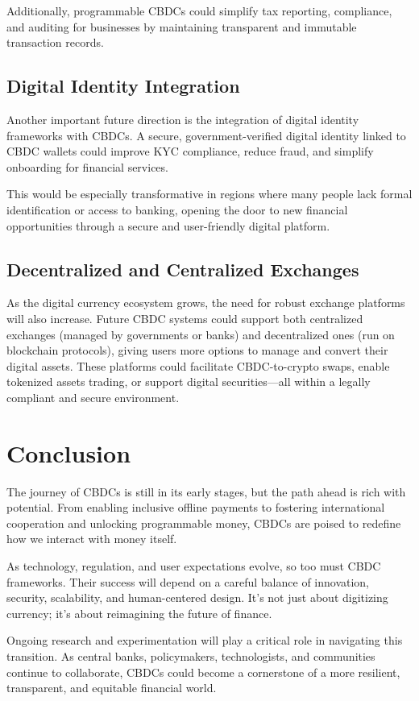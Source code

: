 Additionally, programmable CBDCs could simplify tax reporting, compliance, and auditing for businesses by maintaining transparent and immutable transaction records.

\subsection{Digital Identity Integration}

Another important future direction is the integration of digital identity frameworks with CBDCs. A secure, government-verified digital identity linked to CBDC wallets could improve KYC compliance, reduce fraud, and simplify onboarding for financial services.

This would be especially transformative in regions where many people lack formal identification or access to banking, opening the door to new financial opportunities through a secure and user-friendly digital platform.

\subsection{Decentralized and Centralized Exchanges}

As the digital currency ecosystem grows, the need for robust exchange platforms will also increase. Future CBDC systems could support both centralized exchanges (managed by governments or banks) and decentralized ones (run on blockchain protocols), giving users more options to manage and convert their digital assets. These platforms could facilitate CBDC-to-crypto swaps, enable tokenized assets trading, or support digital securities—all within a legally compliant and secure environment.

\section{Conclusion}

The journey of CBDCs is still in its early stages, but the path ahead is rich with potential. From enabling inclusive offline payments to fostering international cooperation and unlocking programmable money, CBDCs are poised to redefine how we interact with money itself.

As technology, regulation, and user expectations evolve, so too must CBDC frameworks. Their success will depend on a careful balance of innovation, security, scalability, and human-centered design. It’s not just about digitizing currency; it’s about reimagining the future of finance.

Ongoing research and experimentation will play a critical role in navigating this transition. As central banks, policymakers, technologists, and communities continue to collaborate, CBDCs could become a cornerstone of a more resilient, transparent, and equitable financial world.
